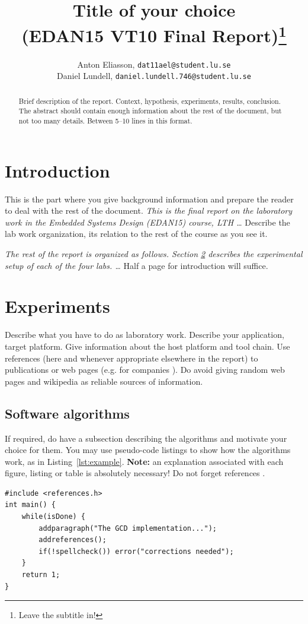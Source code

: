 \documentclass[11pt]{article}
\title{Title of your choice\\\small{(EDAN15 VT10 Final Report)}\footnote{Leave the subtitle in!}}
\author{
Anton Eliasson, \texttt{dat11ael@student.lu.se}\\
Daniel Lundell, \texttt{daniel.lundell.746@student.lu.se}
}
\begin{document}
\lstset{
	language=C,
	captionpos=b,
	basicstyle=\footnotesize\ttfamily
}

\maketitle

\begin{abstract}
Brief description of the report. Context, hypothesis, experiments, results, conclusion. The abstract should contain enough
information about the rest of the document, but not too many details. Between 5--10 lines in this format.
\end{abstract}
\section{Introduction}
This is the part where you give background information and prepare the reader to deal with the rest of the document. \textit{This is the final report on the laboratory work in the Embedded Systems Design (EDAN15) course, LTH \ldots} Describe the lab work organization, its relation to the rest of the course as you see it.

\textit{The rest of the report is organized as follows. Section \ref{sec:exp} describes the experimental setup of each of the four labs. \ldots} Half a page for introduction will suffice.
\section{Experiments}\label{sec:exp}
Describe what you have to do as laboratory work. Describe your application, target platform. Give information about the host platform and tool chain. Use references (here and whenever appropriate elsewhere in the report) to publications \cite{microblaze} or web pages (e.g. for companies \cite{xilinx}). Do avoid giving random web pages and wikipedia as reliable sources of information.
\subsection{Software algorithms}
If required, do have a subsection describing the algorithms and motivate your choice for them. You may use pseudo-code listings to show how the algorithms work, as in Listing~\ref{lst:example}. \textbf{Note:} an explanation associated with each figure, listing or table is absolutely necessary! Do not forget references \cite{1214341}.
\begin{lstlisting}[float=tbh,frame=tb,captionpos=b,caption={Working on your report},label=lst:example]
#include <references.h>
int main() {
	while(isDone) {
		addparagraph("The GCD implementation...");
		addreferences();
		if(!spellcheck()) error("corrections needed");
	}
	return 1;
}
\end{lstlisting}
\end{document}
